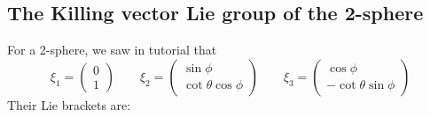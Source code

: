 \documentclass{article}
\begin{document}
\subsection{The Killing vector Lie group of the 2-sphere}
For a 2-sphere, we saw in tutorial that
\begin{equation}
    \xi_1 = \begin{pmatrix}0 \\ 1\end{pmatrix} \qquad
    \xi_2 = \begin{pmatrix}\sin\phi \\ \cot\theta\cos\phi\end{pmatrix} \qquad
    \xi_3 = \begin{pmatrix}\cos\phi \\ -\cot\theta\sin\phi\end{pmatrix}
\end{equation}
Their Lie brackets are:
\end{document}
